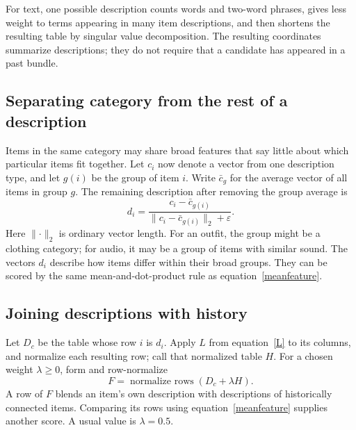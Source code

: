 \documentclass[11pt,a4paper]{article}
\numberwithin{equation}{section}
\begin{document}
For text, one possible description counts words and two-word phrases, gives less weight
to terms appearing in many item descriptions, and then shortens the resulting table by
singular value decomposition. The resulting coordinates summarize descriptions; they do
not require that a candidate has appeared in a past bundle.

\subsection{Separating category from the rest of a description}
Items in the same category may share broad features that say little about which particular
items fit together. Let $c_i$ now denote a vector from one description type, and let
$g(i)$ be the group of item $i$. Write $\bar c_g$ for the average vector of all items in
group $g$. The remaining description after removing the group average is
\begin{equation}
 d_i=\frac{c_i-\bar c_{g(i)}}{\lVert c_i-\bar c_{g(i)}\rVert_2+\varepsilon}.
\end{equation}
Here $\lVert\cdot\rVert_2$ is ordinary vector length. For an outfit, the group might be a
clothing category; for audio, it may be a group of items with similar sound. The vectors
$d_i$ describe how items differ within their broad groups. They can be scored by the same
mean-and-dot-product rule as equation~\eqref{meanfeature}.

\subsection{Joining descriptions with history}
Let $D_c$ be the table whose row $i$ is $d_i$. Apply $L$ from equation~\eqref{L} to its
columns, and normalize each resulting row; call that normalized table $H$. For a chosen
weight $\lambda\ge0$, form and row-normalize
\begin{equation}
 F=\operatorname{normalize\ rows}(D_c+\lambda H).
\end{equation}
A row of $F$ blends an item's own description with descriptions of historically connected
items. Comparing its rows using equation~\eqref{meanfeature} supplies another score.
A usual value is $\lambda=0.5$.
\end{document}
